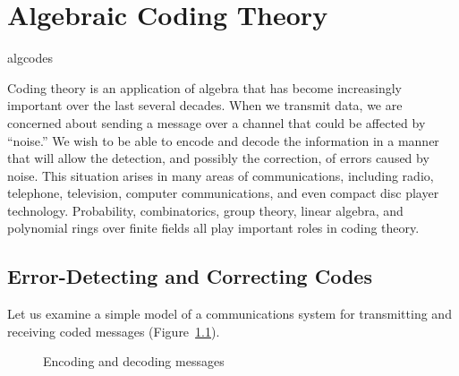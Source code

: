 \chapter{Algebraic Coding Theory}{algcodes}
 

Coding theory is an application of algebra that has become
increasingly important over the last several decades. When we transmit
data, we are concerned about sending a message over a channel that
could be affected by ``noise.'' We wish to be able to encode and
decode the information in a manner that will allow the detection, and
possibly the correction, of errors caused by noise. This situation
arises in many areas of communications, including radio, telephone,
television, computer communications, and even compact disc player
technology. Probability, combinatorics, group theory, linear algebra,
and polynomial rings over finite fields all play important roles in
coding theory.  
 

\section{Error-Detecting and Correcting Codes}

Let us examine a simple model of a communications system for
transmitting and receiving coded messages (Figure~\ref{encoding}).  

\begin{figure}[htb] %
\begin{center}


\caption{Encoding and decoding messages}
\end{center}
\label{encoding}
\end{figure}

